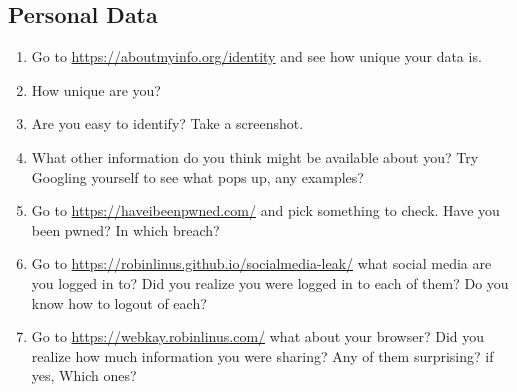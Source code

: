 \documentclass[12pt]{article}
\begin{document}
\subsection*{Personal Data}
    \begin{enumerate}
        \item Go to \url{https://aboutmyinfo.org/identity} and see how unique your data is.   
        \item How unique are you?
        \item Are you easy to identify? Take a screenshot.
        \item What other information do you think might be available about you? Try Googling yourself to see what pops up, any examples?
        \item Go to \url{https://haveibeenpwned.com/} and pick something to check.  Have you been pwned? In which breach?
        \item Go to \url{https://robinlinus.github.io/socialmedia-leak/} what social media are you logged in to? Did you realize you were logged in to each of them? Do you know how to logout of each?
        \item Go to \url{https://webkay.robinlinus.com/} what about your browser? Did you realize how much information you were sharing? Any of them surprising? if yes, Which ones?
        
    \end{enumerate}
\end{document}
